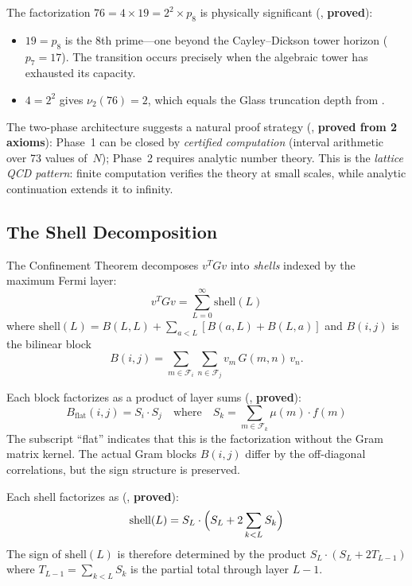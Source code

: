 The factorization $76 = 4 \times 19 = 2^2 \times p_8$ is
physically significant (,
\textbf{proved}):
\begin{itemize}
  \item $19 = p_8$ is the 8th prime---one beyond the Cayley--Dickson
    tower horizon ($p_7 = 17$). The transition occurs precisely when
    the algebraic tower has exhausted its capacity.
  \item $4 = 2^2$ gives $\nu_2(76) = 2$, which equals the Glass
    truncation depth from .
\end{itemize}

The two-phase architecture suggests a natural proof strategy
(, \textbf{proved from 2 axioms}):
Phase~1 can be closed by \emph{certified computation}
(interval arithmetic over 73 values of~$N$); Phase~2 requires
analytic number theory. This is the \emph{lattice QCD pattern}:
finite computation verifies the theory at small scales, while
analytic continuation extends it to infinity.

\subsection{The Shell Decomposition}

The Confinement Theorem decomposes $v^T G v$ into \emph{shells}
indexed by the maximum Fermi layer:
\begin{equation}
  v^T G v = \sum_{L=0}^{\infty} \text{shell}(L)
  \label{eq:shell-decomp}
\end{equation}
where $\text{shell}(L) = B(L,L) + \sum_{a < L} [B(a,L) + B(L,a)]$
and $B(i,j)$ is the bilinear block
\[
  B(i,j) = \sum_{m \in \mathcal{F}_i} \sum_{n \in \mathcal{F}_j}
  v_m\, G(m,n)\, v_n.
\]

\begin{observation}
Each block factorizes as a product of layer sums
(, \textbf{proved}):
\[
  B_{\text{flat}}(i,j) = S_i \cdot S_j
  \quad\text{where}\quad
  S_k = \sum_{m \in \mathcal{F}_k} \mu(m) \cdot f(m)
\]
The subscript ``flat'' indicates that this is the factorization
without the Gram matrix kernel. The actual Gram blocks $B(i,j)$
differ by the off-diagonal correlations, but the sign structure
is preserved.
\end{observation}

\begin{observation}
Each shell factorizes as
(, \textbf{proved}):
\[
  \text{shell}(L) = S_L \cdot \Bigl(S_L + 2\sum_{k<L} S_k\Bigr)
\]
The sign of $\text{shell}(L)$ is therefore determined by the
product $S_L \cdot (S_L + 2T_{L-1})$ where $T_{L-1} = \sum_{k<L} S_k$
is the partial total through layer $L-1$.
\end{observation}

